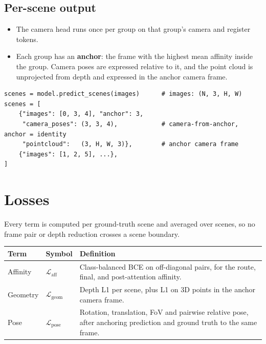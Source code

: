 \documentclass[11pt, a4paper]{article}
\newcommand{\Lall}{\mathcal{L}}
\begin{document}
\subsection{Per-scene output}
\begin{itemize}
  \item The camera head runs once per group on that group's camera and register tokens.
  \item Each group has an \textbf{anchor}: the frame with the highest mean affinity inside the group.
        Camera poses are expressed relative to it, and the point cloud is unprojected from depth
        and expressed in the anchor camera frame.
\end{itemize}
\begin{tcolorbox}[enhanced, colback=softgray, colframe=rulegray, boxrule=0.5pt, arc=2pt,
                  left=8pt, right=8pt, top=4pt, bottom=4pt]
\begin{verbatim}
scenes = model.predict_scenes(images)      # images: (N, 3, H, W)
scenes = [
    {"images": [0, 3, 4], "anchor": 3,
     "camera_poses": (3, 3, 4),            # camera-from-anchor, anchor = identity
     "pointcloud":   (3, H, W, 3)},        # anchor camera frame
    {"images": [1, 2, 5], ...},
]
\end{verbatim}
\end{tcolorbox}

\section{Losses}
\label{sec:loss}
Every term is computed per ground-truth scene and averaged over scenes, so no frame pair or
depth reduction crosses a scene boundary.

\begin{table}[h]
  \centering
  \small
  \renewcommand{\arraystretch}{1.35}
  \begin{tabularx}{\textwidth}{@{}l l X@{}}
    \toprule
    \textbf{Term} & \textbf{Symbol} & \textbf{Definition} \\
    \midrule
    Affinity & $\Lall_{\text{aff}}$ & Class-balanced BCE on off-diagonal pairs, for the route, final, and post-attention affinity. \\
    Geometry & $\Lall_{\text{geom}}$ & Depth L1 per scene, plus L1 on 3D points in the anchor camera frame. \\
    Pose     & $\Lall_{\text{pose}}$ & Rotation, translation, FoV and pairwise relative pose, after anchoring prediction and ground truth to the same frame. \\
    \bottomrule
  \end{tabularx}
\end{table}
\end{document}
